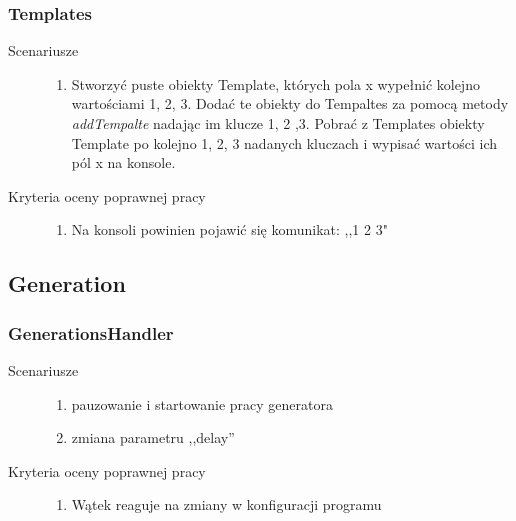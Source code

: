 \documentclass[a4paper,11pt]{article}
\begin{document}
\subsubsection{Templates}
\begin{description}

\item[Scenariusze] \hfill
\begin{enumerate}
\item Stworzyć puste obiekty Template, których pola x wypełnić kolejno wartościami 1, 2, 3. Dodać te obiekty do Tempaltes za pomocą metody \textit{addTempalte} nadając im  klucze 1, 2 ,3. Pobrać z Templates obiekty Template po kolejno 1, 2, 3 nadanych kluczach i wypisać wartości ich pól x na konsole.

\end{enumerate}

\item[Kryteria oceny poprawnej pracy] \hfill
\begin{enumerate}
\item  Na konsoli powinien pojawić się komunikat: ,,1 2 3"

\end{enumerate}

\end{description}

\subsection{Generation}
\subsubsection{GenerationsHandler}
\begin{description}

\item[Scenariusze] \hfill
\begin{enumerate}
\item pauzowanie i startowanie pracy generatora
\item zmiana parametru ,,delay''
\end{enumerate}

\item[Kryteria oceny poprawnej pracy] \hfill
\begin{enumerate}
\item Wątek reaguje na zmiany w konfiguracji programu

\end{enumerate}

\end{description}
\end{document}
